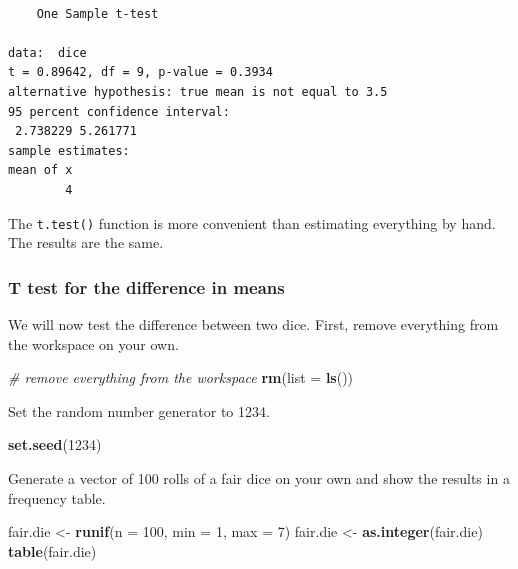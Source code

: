 \documentclass[]{article}
\newenvironment{Shaded}{\begin{snugshade}}{\end{snugshade}}
\newcommand{\KeywordTok}[1]{\textcolor[rgb]{0.13,0.29,0.53}{\textbf{#1}}}
\newcommand{\DataTypeTok}[1]{\textcolor[rgb]{0.13,0.29,0.53}{#1}}
\newcommand{\DecValTok}[1]{\textcolor[rgb]{0.00,0.00,0.81}{#1}}
\newcommand{\StringTok}[1]{\textcolor[rgb]{0.31,0.60,0.02}{#1}}
\newcommand{\CommentTok}[1]{\textcolor[rgb]{0.56,0.35,0.01}{\textit{#1}}}
\newcommand{\NormalTok}[1]{#1}
\theoremstyle{definition}
\theoremstyle{definition}
\theoremstyle{definition}
\theoremstyle{remark}
\begin{document}
\begin{verbatim}

    One Sample t-test

data:  dice
t = 0.89642, df = 9, p-value = 0.3934
alternative hypothesis: true mean is not equal to 3.5
95 percent confidence interval:
 2.738229 5.261771
sample estimates:
mean of x 
        4 
\end{verbatim}

The \texttt{t.test()} function is more convenient than estimating
everything by hand. The results are the same.

\subsubsection{T test for the difference in
means}\label{t-test-for-the-difference-in-means}

We will now test the difference between two dice. First, remove
everything from the workspace on your own.

\begin{Shaded}
\begin{Highlighting}[]
\CommentTok{# remove everything from the workspace}
\KeywordTok{rm}\NormalTok{(}\DataTypeTok{list =} \KeywordTok{ls}\NormalTok{())}
\end{Highlighting}
\end{Shaded}

Set the random number generator to 1234.

\begin{Shaded}
\begin{Highlighting}[]
\KeywordTok{set.seed}\NormalTok{(}\DecValTok{1234}\NormalTok{)}
\end{Highlighting}
\end{Shaded}

Generate a vector of 100 rolls of a fair dice on your own and show the
results in a frequency table.

\begin{Shaded}
\begin{Highlighting}[]
\NormalTok{fair.die <-}\StringTok{ }\KeywordTok{runif}\NormalTok{(}\DataTypeTok{n =} \DecValTok{100}\NormalTok{, }\DataTypeTok{min =} \DecValTok{1}\NormalTok{, }\DataTypeTok{max =} \DecValTok{7}\NormalTok{)}
\NormalTok{fair.die <-}\StringTok{ }\KeywordTok{as.integer}\NormalTok{(fair.die)}
\KeywordTok{table}\NormalTok{(fair.die)}
\end{Highlighting}
\end{Shaded}
\end{document}
